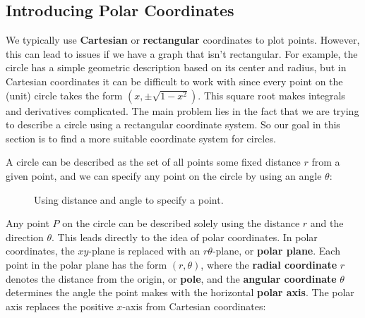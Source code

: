 \documentclass[10pt,]{book}
\newcommand{\terminology}[1]{\textbf{#1}}
\numberwithin{equation}{section}
\begin{document}
\subsection[{Introducing Polar Coordinates}]{Introducing Polar Coordinates}\label{subsection-introducing-polar-coordinates}
\hypertarget{p-1014}{}%
We typically use \terminology{Cartesian} or \terminology{rectangular} coordinates to plot points. However, this can lead to issues if we have a graph that isn't rectangular. For example, the circle has a simple geometric description based on its center and radius, but in Cartesian coordinates it can be difficult to work with since every point on the (unit) circle takes the form \((x,\pm\sqrt{1-x^{2}})\). This square root makes integrals and derivatives complicated. The main problem lies in the fact that we are trying to describe a circle using a rectangular coordinate system. So our goal in this section is to find a more suitable coordinate system for circles.%
\par
\hypertarget{p-1015}{}%
A circle can be described as the set of all points some fixed distance \(r\) from a given point, and we can specify any point on the circle by using an angle \(\theta\):%
\begin{figure}
\centering
{
}
\caption{Using distance and angle to specify a point.\label{figure-polar-coords}}
\end{figure}
\hypertarget{p-1016}{}%
Any point \(P\) on the circle can be described solely using the distance \(r\) and the direction \(\theta\). This leads directly to the idea of polar coordinates. In polar coordinates, the \(xy\)-plane is replaced with an \(r\theta\)-plane, or \terminology{polar plane}. Each point in the polar plane has the form \((r,\theta)\), where the \terminology{radial coordinate} \(r\) denotes the distance from the origin, or \terminology{pole}, and the \terminology{angular coordinate} \(\theta\) determines the angle the point makes with the horizontal \terminology{polar axis}. The polar axis replaces the positive \(x\)-axis from Cartesian coordinates:%
\end{document}
